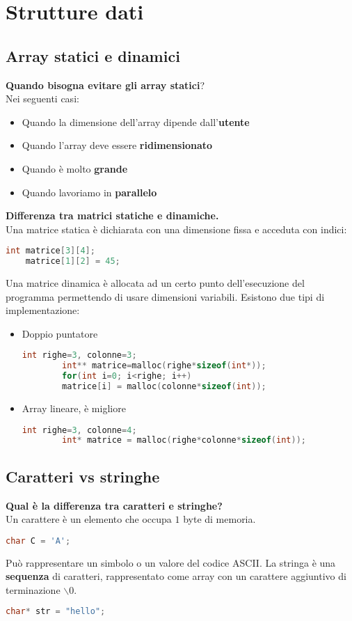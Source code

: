 \newpage
\section{Strutture dati}
\subsection{Array statici e dinamici}
\textbf{Quando bisogna evitare gli array statici}?\\
Nei seguenti casi:
\begin{itemize}
	\item Quando la dimensione dell'array dipende dall'\textbf{utente}
	\item Quando l'array deve essere \textbf{ridimensionato}
	\item Quando è molto \textbf{grande}
	\item Quando lavoriamo in \textbf{parallelo}
\end{itemize}
\textbf{Differenza tra matrici statiche e dinamiche.}\\
Una matrice statica è dichiarata con una dimensione fissa e acceduta con indici:
\begin{lstlisting}[language=C]
	int matrice[3][4];
	matrice[1][2] = 45;
\end{lstlisting}
Una matrice dinamica è allocata ad un certo punto dell'esecuzione del programma permettendo di usare dimensioni variabili. Esistono due tipi di implementazione:
\begin{itemize}
	\item Doppio puntatore
	\begin{lstlisting}[language=C]
		int righe=3, colonne=3;
		int** matrice=malloc(righe*sizeof(int*));
		for(int i=0; i<righe; i++)
		matrice[i] = malloc(colonne*sizeof(int));
	\end{lstlisting}
	\item Array lineare, è migliore
	\begin{lstlisting}[language=C]
		int righe=3, colonne=4;
		int* matrice = malloc(righe*colonne*sizeof(int));
	\end{lstlisting}
\end{itemize}
\subsection{Caratteri vs stringhe}
\textbf{Qual è la differenza tra caratteri e stringhe?}\\
Un carattere è un elemento che occupa $1$ byte di memoria.
\begin{lstlisting}[language=C]
	char C = 'A';
\end{lstlisting}
Può rappresentare un simbolo o un valore del codice ASCII.
La stringa è una \textbf{sequenza} di caratteri, rappresentato come array con un carattere aggiuntivo di terminazione $\backslash 0$.
\begin{lstlisting}[language=C]
	char* str = "hello";
\end{lstlisting}
